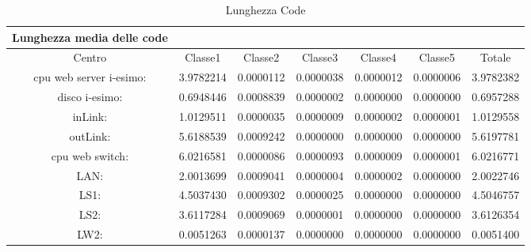 \begin{table}[htbp]
\begin{center}
\begin{tabular}{||c|c|c|c|c|c|c||}
\hline
Lunghezza media delle code\\
\hline
Centro &Classe1 &Classe2 &Classe3 &Classe4 &Classe5 &Totale\\
\hline
\hline
 cpu web server i-esimo: 	&3.9782214	&0.0000112	&0.0000038	&0.0000012	&0.0000006	&3.9782382\\
\hline
 disco i-esimo: 	&0.6948446	&0.0008839	&0.0000002	&0.0000000	&0.0000000	&0.6957288\\
\hline
 inLink: 	&1.0129511	&0.0000035	&0.0000009	&0.0000002	&0.0000001	&1.0129558\\
\hline
 outLink: 	&5.6188539	&0.0009242	&0.0000000	&0.0000000	&0.0000000	&5.6197781\\
\hline
 cpu web switch: 	&6.0216581	&0.0000086	&0.0000093	&0.0000009	&0.0000001	&6.0216771\\
\hline
 LAN: 	&2.0013699	&0.0009041	&0.0000004	&0.0000002	&0.0000000	&2.0022746\\
\hline
 LS1: 	&4.5037430	&0.0009302	&0.0000025	&0.0000000	&0.0000000	&4.5046757\\
\hline
 LS2: 	&3.6117284	&0.0009069	&0.0000001	&0.0000000	&0.0000000	&3.6126354\\
\hline
 LW2: 	&0.0051263	&0.0000137	&0.0000000	&0.0000000	&0.0000000	&0.0051400\\
\hline
\end{tabular}
\end{center}
\caption{Lunghezza Code}
\label{lunghezzacode}
\end{table}

